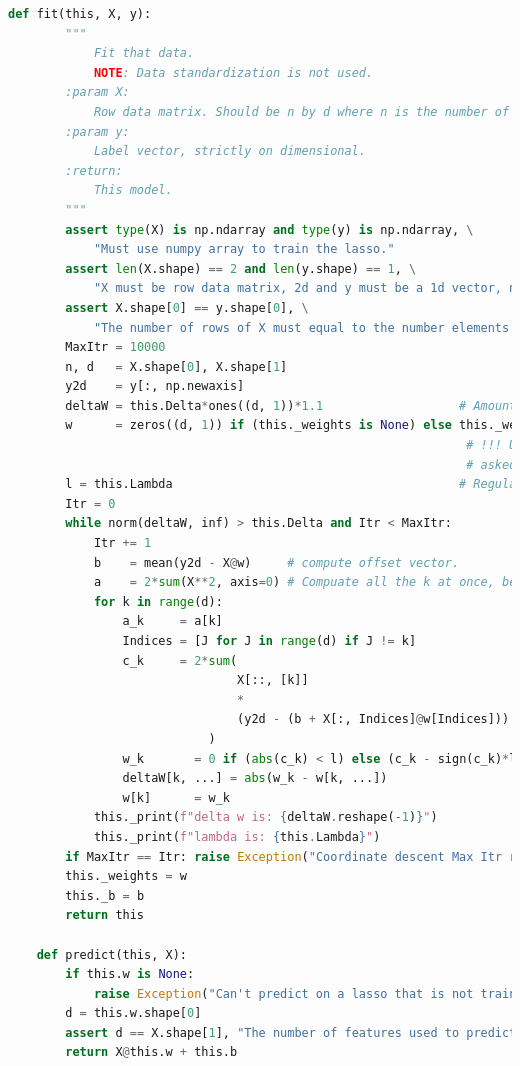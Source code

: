 \documentclass[]{article}
\begin{document}
\begin{lstlisting}[language=python]
    def fit(this, X, y):
        """
            Fit that data.
            NOTE: Data standardization is not used.
        :param X:
            Row data matrix. Should be n by d where n is the number of samples and d is the number of features.
        :param y:
            Label vector, strictly on dimensional.
        :return:
            This model.
        """
        assert type(X) is np.ndarray and type(y) is np.ndarray, \
            "Must use numpy array to train the lasso."
        assert len(X.shape) == 2 and len(y.shape) == 1, \
            "X must be row data matrix, 2d and y must be a 1d vector, numerical."
        assert X.shape[0] == y.shape[0], \
            "The number of rows of X must equal to the number elements in y. "
        MaxItr = 10000
        n, d   = X.shape[0], X.shape[1]
        y2d    = y[:, np.newaxis]
        deltaW = this.Delta*ones((d, 1))*1.1                   # Amount of changes for each predictor while iterating
        w      = zeros((d, 1)) if (this._weights is None) else this._weights.copy()
                                                                # !!! Use previous for optimization if model is
                                                                # asked to optimize for a second time.
        l = this.Lambda                                        # Regularizer !!!
        Itr = 0
        while norm(deltaW, inf) > this.Delta and Itr < MaxItr:
            Itr += 1
            b    = mean(y2d - X@w)     # compute offset vector.
            a    = 2*sum(X**2, axis=0) # Compuate all the k at once, because it's not related to w_k
            for k in range(d):
                a_k     = a[k]
                Indices = [J for J in range(d) if J != k]
                c_k     = 2*sum(
                                X[::, [k]]
                                *
                                (y2d - (b + X[:, Indices]@w[Indices]))
                            )
                w_k       = 0 if (abs(c_k) < l) else (c_k - sign(c_k)*l)/a_k
                deltaW[k, ...] = abs(w_k - w[k, ...])
                w[k]      = w_k
            this._print(f"delta w is: {deltaW.reshape(-1)}")
            this._print(f"lambda is: {this.Lambda}")
        if MaxItr == Itr: raise Exception("Coordinate descent Max Itr reached without converging")
        this._weights = w
        this._b = b
        return this

    def predict(this, X):
        if this.w is None:
            raise Exception("Can't predict on a lasso that is not trained yet")
        d = this.w.shape[0]
        assert d == X.shape[1], "The number of features used to predict doesn't match with what is trained on "
        return X@this.w + this.b


\end{lstlisting}
\end{document}
